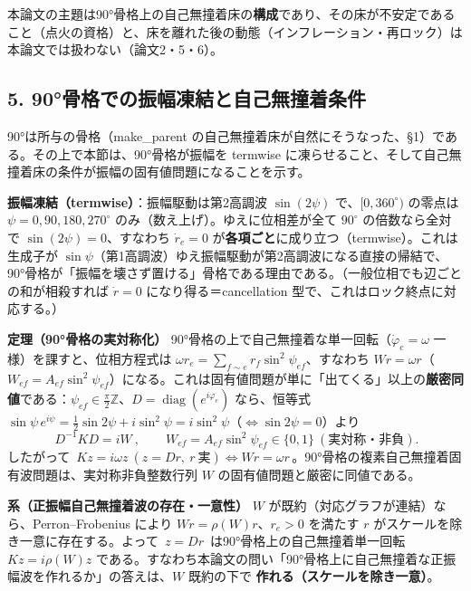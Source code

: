 \documentclass[
  a4paper,
]{ltjsarticle}
\begin{document}
本論文の主題は90°骨格上の自己無撞着床の\textbf{構成}であり、その床が不安定であること（点火の資格）と、床を離れた後の動態（インフレーション・再ロック）は本論文では扱わない（論文2・5・6）。

\subsection{5.
90°骨格での振幅凍結と自己無撞着条件}\label{ux9aa8ux683cux3067ux306eux632fux5e45ux51cdux7d50ux3068ux81eaux5df1ux7121ux649eux7740ux6761ux4ef6}

90°は所与の骨格（make\_parent
の自己無撞着床が自然にそうなった、§1）である。その上で本節は、90°骨格が振幅を
termwise
に凍らせること、そして自己無撞着床の条件が振幅の固有値問題になることを示す。

\textbf{振幅凍結（termwise）}：振幅駆動は第2高調波 \(\sin(2\psi)\)
で、\([0,360^\circ)\) の零点は \(\psi=0,90,180,270^\circ\)
のみ（数え上げ）。ゆえに位相差が全て \(90^\circ\) の倍数なら全対で
\(\sin(2\psi)=0\)、すなわち \(\dot r_e=0\)
が\textbf{各項ごと}に成り立つ（termwise）。これは生成子が
\(\sin\psi\)（第1高調波）ゆえ振幅駆動が第2高調波になる直接の帰結で、90°骨格が「振幅を壊さず置ける」骨格である理由である。（一般位相でも辺ごとの和が相殺すれば
\(\dot r=0\) になり得る＝cancellation
型で、これはロック終点に対応する。）

\textbf{定理（90°骨格の実対称化）}
90°骨格の上で自己無撞着な単一回転（\(\dot\varphi_e=\omega\)
一様）を課すと、位相方程式は
\(\omega r_e=\sum_{f\sim e}r_f\sin^2\psi_{ef}\)、すなわち
\(Wr=\omega r\)（\(W_{ef}=A_{ef}\sin^2\psi_{ef}\)）になる。これは固有値問題が単に「出てくる」以上の\textbf{厳密同値}である：\(\psi_{ef}\in\frac{\pi}{2}\mathbb Z\)、\(D=\operatorname{diag}(e^{i\varphi_e})\)
なら、恒等式
\(\sin\psi\,e^{i\psi}=\tfrac12\sin2\psi+i\sin^2\psi=i\sin^2\psi\)（\(\Leftrightarrow\sin2\psi=0\)）より
\[\boxed{\ D^{-1}KD=iW\ },\qquad W_{ef}=A_{ef}\sin^2\psi_{ef}\in\{0,1\}\ (\text{実対称・非負}).\]
したがって
\(\boxed{\,Kz=i\omega z\ (z=Dr,\ r\ \text{実})\iff Wr=\omega r\,}\)。90°骨格の複素自己無撞着固有波問題は、実対称非負整数行列
\(W\) の固有値問題と厳密に同値である。

\textbf{系（正振幅自己無撞着波の存在・一意性）} \(W\)
が既約（対応グラフが連結）なら、Perron--Frobenius により
\(Wr=\rho(W)r\)、\(r_e>0\) を満たす \(r\)
がスケールを除き一意に存在する。よって \(\boxed{\,z=Dr\,}\)
は90°骨格上の自己無撞着単一回転 \(Kz=i\rho(W)z\)
である。すなわち本論文の問い「90°骨格上に自己無撞着な正振幅波を作れるか」の答えは、\(W\)
既約の下で \textbf{作れる（スケールを除き一意）}。
\end{document}
